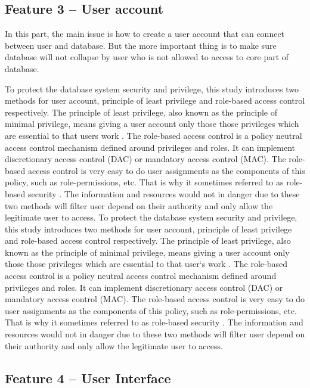 \documentclass[a4paper]{article} %
\begin{document}
	\subsection*{Feature 3 -- User account}
	\label{task1:feature3}
	
	In this part, the main issue is how to create a user account that can connect between user and database. But the more important thing is to make sure database will not collapse by user who is not allowed to access to core part of database.
	
	To protect the database system security and privilege, this study introduces two methods for user account, principle of least privilege and role-based access control respectively. The principle of least privilege, also known as the principle of minimal privilege, means giving a user account only those those privileges which are essential to that users work \cite{PrincipleLeastPrivilege}. The role-based access control is a policy neutral access control mechanism defined around privileges and roles. It can implement discretionary access control (DAC) or mandatory access control (MAC). The role-based access control is very easy to do user assignments as the components of this policy, such as role-permissions, etc. That is why it sometimes referred to as role-based security \cite{RoleBasedAccessControl}. The information and resources would not in danger due to these two methods will filter user depend on their authority and only allow the legitimate user to access.	
	To protect the database system security and privilege, this study introduces two methods for user account, principle of least privilege and role-based access control respectively. The principle of least privilege, also known as the principle of minimal privilege, means giving a user account only those those privileges which are essential to that user`s work \cite{PrincipleLeastPrivilege}. The role-based access control is a policy neutral access control mechanism defined around privileges and roles. It can implement discretionary access control (DAC) or mandatory access control (MAC). The role-based access control is very easy to do user assignments as the components of this policy, such as role-permissions, etc. That is why it sometimes referred to as role-based security \cite{RoleBasedAccessControl}. The information and resources would not in danger due to these two methods will filter user depend on their authority and only allow the legitimate user to access.
	
	\subsection*{Feature 4 -- User Interface}
	\label{task1:feature4}
	
\end{document}
